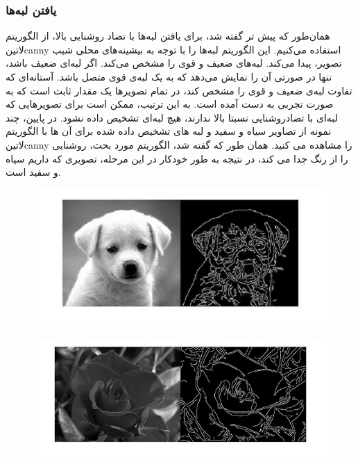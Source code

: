  \subsubsection{یافتن لبه‌ها }
 
 همان‌طور که پیش تر گفته شد، برای یافتن لبه‌ها با تضاد روشنایی بالا، از الگوریتم 
  ‌لاتین{canny }
 استفاده می‌کنیم.
 این الگوریتم لبه‌ها را با توجه به بیشینه‌های محلی شیب تصویر، پیدا می‌کند. لبه‌های ضعیف و قوی را مشخص می‌کند. اگر لبه‌ای ضعیف باشد، تنها در صورتی آن را نمایش می‌دهد که به یک لبه‌ی قوی متصل باشد. آستانه‌ای که تفاوت لبه‌ی ضعیف و قوی را مشخص کند، در تمام تصویر‌ها یک مقدار ثابت است که به صورت تجربی به دست آمده است. به این ترتیب، ممکن است برای تصویر‌هایی که لبه‌ای با تضادروشنایی نسبتا بالا ندارند، هیچ لبه‌ای تشخیص داده نشود.
 در پایین، چند نمونه از تصاویر سیاه و سفید و لبه های تشخیص داده شده برای آن ها با الگوریتم 
   ‌لاتین{canny }
 را مشاهده می کنید. همان طور که گفته شد، الگوریتم مورد بحث، روشنایی را از رنگ جدا می کند، در نتیجه به طور خودکار در این مرحله، تصویری که داریم سیاه و سفید است.
  \begin{figure}[!htb]
  		\includegraphics[width=\linewidth]{images/cannyexample1}
  		\caption{}\label{fig:logtonemap}
  		\endminipage\hfill
  \end{figure}
  
   
   \begin{figure}[!htb]
   		\includegraphics[width=\linewidth]{images/cannyexample2}
   		\caption{}\label{fig:logtonemap}
   		\endminipage\hfill
   \end{figure}
   

